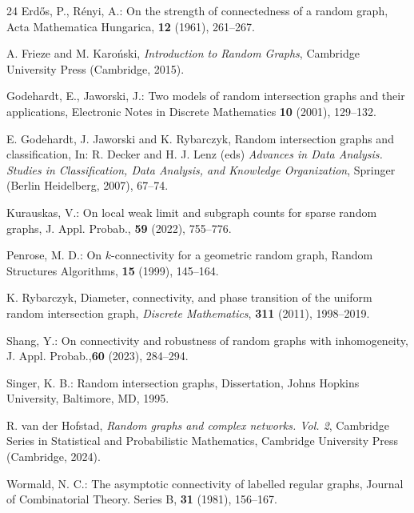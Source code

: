 \documentclass[11pt, a4paper]{article}
\begin{document}
\begin{thebibliography}{24}
Erd\H os, P.,  R\'enyi, A.:
 On the strength of connectedness of a random graph,
Acta Mathematica Hungarica, \textbf{12} (1961), 261--267.


A. Frieze and M.  Karo\'nski,
{\it Introduction to Random Graphs}, Cambridge University Press  (Cambridge, 2015). 

 Godehardt, E., Jaworski, J.: 
 Two models of random intersection graphs and their
applications, Electronic Notes in Discrete Mathematics \textbf{10} (2001), 
129--132.

E. Godehardt, J. Jaworski and K. Rybarczyk, 
Random intersection graphs and classification, 
In: R. Decker and H. J.  Lenz (eds) {\it Advances in Data Analysis. Studies in Classification, Data Analysis, and Knowledge Organization}, Springer (Berlin Heidelberg, 2007), 67--74.


 Kurauskas, V.:
 On local weak limit and subgraph counts for sparse random graphs,
J. Appl. Probab., \textbf{59} (2022), 755--776.

Penrose, M. D.:
On  $k$-connectivity for a geometric random graph,
Random Structures Algorithms, 
\textbf{15} (1999), 145--164. 


K. Rybarczyk, 
Diameter, connectivity, and phase transition of the uniform random intersection graph,
{\it Discrete Mathematics}, {\bf 311} (2011), 1998--2019.

Shang, Y.: On connectivity and robustness of random graphs with inhomogeneity,
J. Appl. Probab.,\textbf{60} (2023), 284--294.
  
Singer, K. B.: Random intersection graphs, Dissertation, Johns Hopkins University, Baltimore,
MD, 1995.

R.  van der Hofstad, {\it Random graphs and complex networks. Vol. 2}, Cambridge Series in Statistical and Probabilistic Mathematics,
  Cambridge University Press (Cambridge, 2024).


  Wormald, N. C.: The asymptotic connectivity of labelled regular graphs,
Journal of Combinatorial Theory. Series B, 
\textbf{31} (1981), 156–167.


\end{thebibliography}
\end{document}
